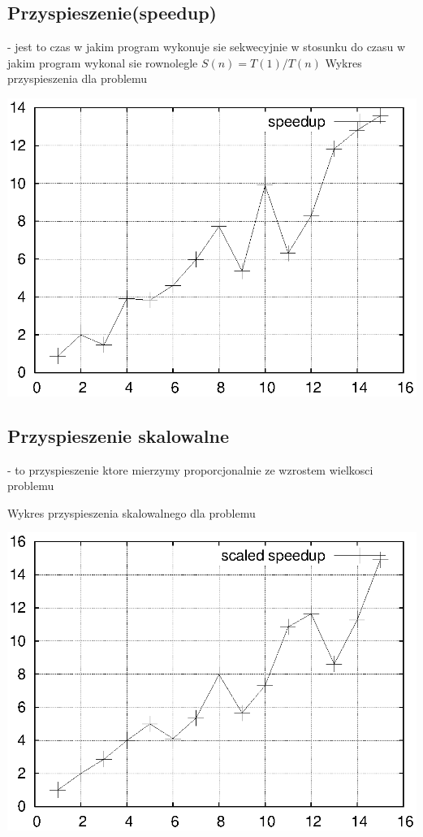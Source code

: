 \documentclass{article}
\begin{document}
\subsection{Przyspieszenie(speedup)} - jest to czas w jakim program wykonuje sie sekwecyjnie w stosunku do czasu w jakim program wykonal sie rownolegle
\( S(n) = T(1) / T(n) \)
Wykres przyspieszenia dla problemu

\includegraphics{speedup.eps}

\subsection{Przyspieszenie skalowalne} - to przyspieszenie ktore mierzymy proporcjonalnie ze wzrostem wielkosci problemu 

Wykres przyspieszenia skalowalnego dla problemu

\includegraphics{speedup_sc.eps}
\end{document}

